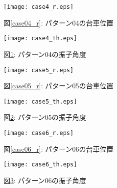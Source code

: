 \begin{figure}[htbp]
    \begin{minipage}{0.5\hsize}
        \begin{center}
            \texttt{[image: case4\_r.eps]}
            \caption{図\ref{case04_r}: パターン04の台車位置}
            \label{case04_r}
        \end{center}
    \end{minipage}
    \begin{minipage}{0.5\hsize}
        \begin{center}
            \texttt{[image: case4\_th.eps]}
            \caption{図\ref{case04_th}: パターン04の振子角度}
            \label{case04_th}
        \end{center}
    \end{minipage}
\end{figure}

\begin{figure}[htbp]
    \begin{minipage}{0.5\hsize}
        \begin{center}
            \texttt{[image: case5\_r.eps]}
            \caption{図\ref{case05_r}: パターン05の台車位置}
            \label{case05_r}
        \end{center}
    \end{minipage}
    \begin{minipage}{0.5\hsize}
        \begin{center}
            \texttt{[image: case5\_th.eps]}
            \caption{図\ref{case05_th}: パターン05の振子角度}
            \label{case05_th}
        \end{center}
    \end{minipage}
\end{figure}

\begin{figure}[htbp]
    \begin{minipage}{0.5\hsize}
        \begin{center}
            \texttt{[image: case6\_r.eps]}
            \caption{図\ref{case06_r}: パターン06の台車位置}
            \label{case06_r}
        \end{center}
    \end{minipage}
    \begin{minipage}{0.5\hsize}
        \begin{center}
            \texttt{[image: case6\_th.eps]}
            \caption{図\ref{case06_th}: パターン06の振子角度}
            \label{case06_th}
        \end{center}
    \end{minipage}
\end{figure}

